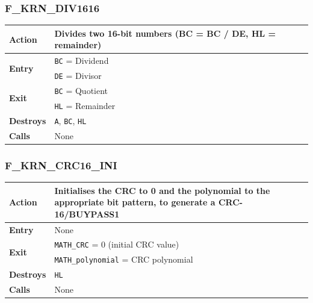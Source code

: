 \documentclass[a4paper,11pt]{article}
\begin{document}
        \subsubsection{F\_KRN\_DIV1616}
        \label{func:fkrndiv1616}
        \begin{tabular}{l p{9cm}}
            \hline\textbf{Action}
            & Divides two 16-bit numbers (BC = BC / DE, HL = remainder)\\
            \hline\multirow[t]{2}{4em}{\textbf{Entry}}
            & \texttt{BC} = Dividend\\
            & \texttt{DE} = Divisor\\
            \hline\multirow[t]{2}{4em}{\textbf{Exit}}
            & \texttt{BC} = Quotient\\
            & \texttt{HL} = Remainder\\
            \hline\textbf{Destroys} & \texttt{A}, \texttt{BC}, \texttt{HL} \\
            \hline\textbf{Calls} & None\\
            \hline
        \end{tabular}

        \subsubsection{F\_KRN\_CRC16\_INI}
        \label{func:fkrncrc16ini}
        \begin{tabular}{l p{9cm}}
            \hline\textbf{Action}
            & Initialises the CRC to 0 and the polynomial to the appropriate bit
            pattern, to generate a CRC-16/BUYPASS1\\
            \hline\textbf{Entry} & None \\
            \hline\multirow[t]{2}{4em}{\textbf{Exit}}
            & \texttt{MATH\_CRC} = 0 (initial CRC value)\\
            & \texttt{MATH\_polynomial} = CRC polynomial\\
            \hline\textbf{Destroys} & \texttt{HL} \\
            \hline\textbf{Calls} & None\\
            \hline
        \end{tabular}
\end{document}
